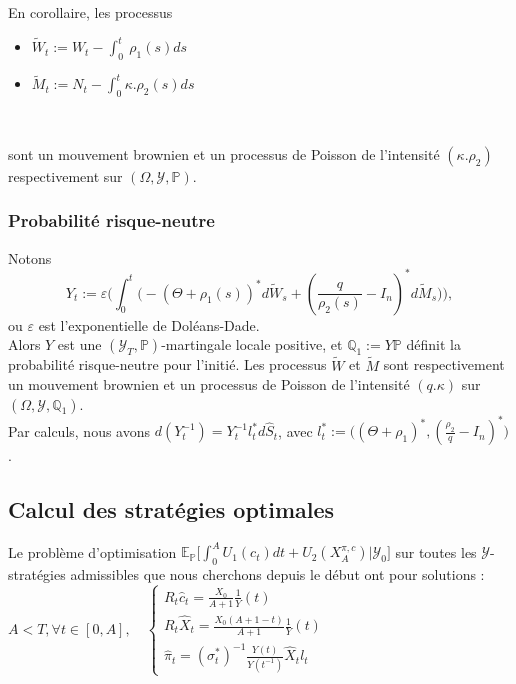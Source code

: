 \documentclass[../finalreport.tex]{subfiles}
\begin{document}
En corollaire, les processus \\

\begin{itemize}
\item $\displaystyle \widetilde{W}_t := W_t - \int_{0}^{t}\ \rho_1(s) ds$\
\item $\displaystyle \widetilde{M}_t := N_t - \int_{0}^{t}\kappa.\rho_2 (s) ds$
\end{itemize}
\ 

sont un mouvement brownien et un processus de Poisson de l'intensité $(\kappa.\rho_2)$ respectivement sur $(\Omega, \mathcal{Y}, \mathbb{P})$.\\

\subsubsection{Probabilité risque-neutre}
Notons
\begin{equation*}
Y_t := \varepsilon \Big(\displaystyle \int_{0}^{t} \big(-(\Theta + \rho_1(s))^* d\widetilde{W}_s + (\frac{q}{\rho_2(s)} - I_n )^* d\widetilde{M}_s\big)\Big), 
\end{equation*}
ou $\varepsilon$ est l'exponentielle de Doléans-Dade. \\

Alors $Y$ est une $(\mathcal{Y}_T, \mathbb{P})$-martingale locale positive, et $\mathbb{Q}_1:= Y \mathbb{P}$ définit la probabilité risque-neutre pour l'initié. Les processus $\widetilde{W}$ et $\widetilde{M}$ sont respectivement un mouvement brownien et un processus de Poisson de l'intensité $(q.\kappa)$ sur $(\Omega, \mathcal{Y}, \mathbb{Q}_1)$.\\

Par calculs, nous avons $\displaystyle d(Y^{-1}_t) = Y^{-1}_t l^*_t d\widehat{S}_t$, avec $\displaystyle l^*_t := \big((\Theta + \rho_1)^*, (\frac{\rho_2}{q} - I_n)^*\big)$.\\

\subsection{Calcul des stratégies optimales}
Le problème d'optimisation $ \mathbb{E}_{\mathbb{P}} \Big[ \displaystyle \int_{0}^{A} U_1(c_t)dt + U_2(X_A^{\pi, c})\Big|\mathcal{Y}_0\Big]$ sur toutes les $\mathcal{Y}$-stratégies admissibles que nous cherchons depuis le début ont pour solutions : \\
 
$A<T, \forall t \in [0, A], \quad \begin{cases}
\displaystyle R_t \widehat{c}_t = \frac{X_0}{A+1} \frac{1}{Y}(t)\\
\displaystyle R_t \widehat{X}_t = \frac{X_0(A+1-t)}{A+1}\frac{1}{Y}(t)\\
\displaystyle \widehat{\pi}_t = (\sigma^*_t)^{-1}\frac{Y(t)}{Y(t^{-1})}\widehat{X}_t l_t
\end{cases}$
\end{document}
